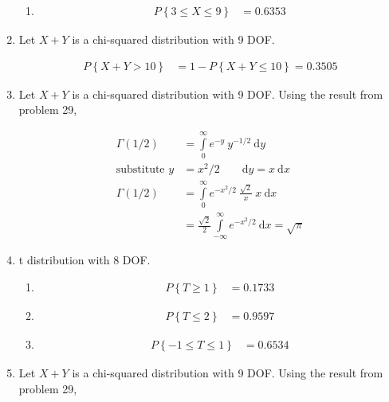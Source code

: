 \begin{enumerate}
\begin{enumerate}
			\item
			\begin{align}
				P \left\{3 \leq X \leq 9\right\} &= 0.6353
			\end{align}
			
		\end{enumerate}
	
	
	\item Let $ X + Y $ is a chi-squared distribution with 9 DOF.
			
		\begin{align}
			P \left\{X + Y > 10\right\} &= 1 - P \left\{X + Y \leq 10\right\} = 0.3505
		\end{align}
	
	
	\item Let $ X + Y $ is a chi-squared distribution with 9 DOF. Using the result from problem 29,
			
		\begin{align}
			\Gamma(1/2) &= \int\limits_{0}^{\infty} e^{-y}\ y^{-1/2}\ \mathrm{d}y \\
			\text{substitute }y &= x^2 / 2 \qquad \mathrm{d}y = x\ \mathrm{d}x \nonumber \\
			\Gamma(1/2) &= \int\limits_{0}^{\infty} e^{-x^2/2}\ \frac{\sqrt{2}}{x}\ x\ \mathrm{d}x \nonumber \\
			&= \frac{\sqrt{2}}{2} \int\limits_{-\infty}^{\infty} e^{-x^2/2}\ \mathrm{d}x = \sqrt{\pi}
		\end{align}
	
	
	\item t distribution with 8 DOF.
			
		\begin{enumerate}
			\item \begin{align}
				P \left\{ T \geq 1 \right\} &= 0.1733
			\end{align}
			
			\item \begin{align}
				P \left\{ T \leq 2 \right\} &= 0.9597
			\end{align}
			
			\item \begin{align}
				P \left\{-1 \leq T \leq 1 \right\} &= 0.6534
			\end{align}
			
		\end{enumerate}
	
	
	\item Let $ X + Y $ is a chi-squared distribution with 9 DOF. Using the result from problem 29,
			

\end{enumerate}
